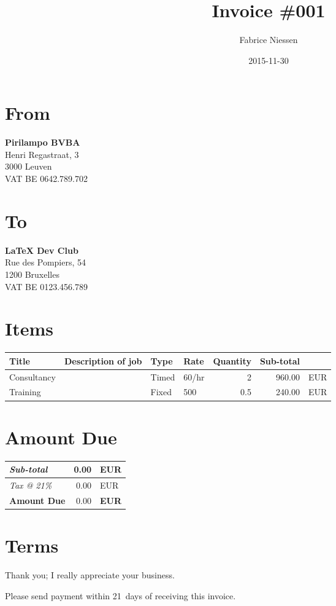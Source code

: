 \documentclass[11pt]{article}
\author{Fabrice Niessen}
\date{2015-11-30}
\title{Invoice \#001}
\begin{document}
\maketitle

\section*{From}
\label{sec:orgheadline1}

\textbf{Pirilampo BVBA} \\
Henri Regastraat, 3 \\
3000 Leuven \\
VAT BE 0642.789.702

\section*{To}
\label{sec:orgheadline2}

\textbf{\LaTeX{} Dev Club} \\
Rue des Pompiers, 54 \\
1200 Bruxelles \\
VAT BE 0123.456.789

\section*{Items}
\label{sec:orgheadline3}

\begin{center}
\label{tab:orgtable1}

\begin{tabular}{llllrrl}
Title & Description of job & Type & Rate & Quantity & Sub-total & \\
\hline
Consultancy &  & Timed & 60/hr & 2 & 960.00 & EUR\\
Training &  & Fixed & 500 & 0.5 & 240.00 & EUR\\
\end{tabular}
\end{center}

\section*{Amount Due}
\label{sec:orgheadline4}

\colorbox{prlp-light-gray}{\begin{minipage}{7.5cm}

\begin{center}
\begin{tabu}{Xrl}
\emph{Sub-total} & 0.00 & EUR\\
\hline
\emph{Tax @ 21\%} & 0.00 & EUR\\
\hline
\textbf{Amount Due} & 0.00 & \textbf{EUR}\\
\end{tabu}
\end{center}

\end{minipage}}

\section*{Terms}
\label{sec:orgheadline5}

Thank you; I really appreciate your business.

Please send payment within 21~days of receiving this invoice.
\end{document}
